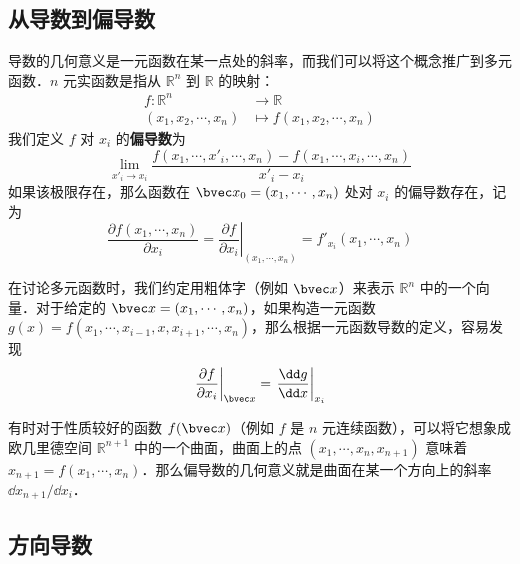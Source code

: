 
\subsection{从导数到偏导数}
导数的几何意义是一元函数在某一点处的斜率，而我们可以将这个概念推广到多元函数．$n$ 元实函数是指从 $\mathbb{R} ^n$ 到 $\mathbb{R}$ 的映射：
\begin{equation}
\begin{aligned}
f:\mathbb{R} ^n&\rightarrow \mathbb{R}\\
(x_1,x_2,\cdots,x_n)&\mapsto f(x_1,x_2,\cdots,x_n)
\end{aligned}
\end{equation}
我们定义 $f$ 对 $x_i$ 的\textbf{偏导数}为
\begin{equation}
\lim\limits_{x'_i\rightarrow x_{i}}\frac{f(x_1,\cdots,x'_i,\cdots,x_n)-f(x_1,\cdots,x_i,\cdots,x_n)}{x'_i-x_i}
\end{equation}
如果该极限存在，那么函数在 $\bvec x_0=(x_1,\cdots,x_n)$ 处对 $x_i$ 的偏导数存在，记为
\begin{equation}
\frac{\partial f(x_1,\cdots,x_n)}{\partial x_i}=\left.\frac{\partial f}{\partial x_i}\right|_{(x_1,\cdots,x_n)}=f'_{x_i}(x_1,\cdots,x_n)
\end{equation}

在讨论多元函数时，我们约定用粗体字（例如 $\bvec x$）来表示 $\mathbb{R}^n$ 中的一个向量．对于给定的 $\bvec x=(x_1,\cdots,x_n)$，如果构造一元函数 $g(x)=f(x_1,\cdots,x_{i-1},x,x_{i+1},\cdots,x_n)$，那么根据一元函数导数的定义，容易发现
\begin{equation}
\left.\frac{\partial f}{\partial x_i}\right|_{\bvec x}=\left.\frac{\dd g}{\dd x}\right|_{x_i}
\end{equation}

有时对于性质较好的函数 $f(\bvec x)$（例如 $f$ 是 $n$ 元连续函数），可以将它想象成欧几里德空间 $\mathbb{R}^{n+1}$ 中的一个曲面，曲面上的点 $(x_1,\cdots,x_n,x_{n+1})$ 意味着 $x_{n+1}=f(x_1,\cdots,x_n)$．那么偏导数的几何意义就是曲面在某一个方向上的斜率 $\dd x_{n+1}/\dd x_i$．

\subsection{方向导数}
